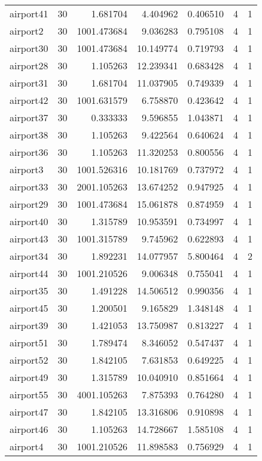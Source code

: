 \documentclass[../../../thesis.tex]{subfiles}
\begin{document}
\begin{longtable}{|l|r|r|r|r|r|r|}
airport41 & 30 & 1.681704 & 4.404962 & 0.406510 & 4 & 1 \\
airport2 & 30 & 1001.473684 & 9.036283 & 0.795108 & 4 & 1 \\
airport30 & 30 & 1001.473684 & 10.149774 & 0.719793 & 4 & 1 \\
airport28 & 30 & 1.105263 & 12.239341 & 0.683428 & 4 & 1 \\
airport31 & 30 & 1.681704 & 11.037905 & 0.749339 & 4 & 1 \\
airport42 & 30 & 1001.631579 & 6.758870 & 0.423642 & 4 & 1 \\
airport37 & 30 & 0.333333 & 9.596855 & 1.043871 & 4 & 1 \\
airport38 & 30 & 1.105263 & 9.422564 & 0.640624 & 4 & 1 \\
airport36 & 30 & 1.105263 & 11.320253 & 0.800556 & 4 & 1 \\
airport3 & 30 & 1001.526316 & 10.181769 & 0.737972 & 4 & 1 \\
airport33 & 30 & 2001.105263 & 13.674252 & 0.947925 & 4 & 1 \\
airport29 & 30 & 1001.473684 & 15.061878 & 0.874959 & 4 & 1 \\
airport40 & 30 & 1.315789 & 10.953591 & 0.734997 & 4 & 1 \\
airport43 & 30 & 1001.315789 & 9.745962 & 0.622893 & 4 & 1 \\
airport34 & 30 & 1.892231 & 14.077957 & 5.800464 & 4 & 2 \\
airport44 & 30 & 1001.210526 & 9.006348 & 0.755041 & 4 & 1 \\
airport35 & 30 & 1.491228 & 14.506512 & 0.990356 & 4 & 1 \\
airport45 & 30 & 1.200501 & 9.165829 & 1.348148 & 4 & 1 \\
airport39 & 30 & 1.421053 & 13.750987 & 0.813227 & 4 & 1 \\
airport51 & 30 & 1.789474 & 8.346052 & 0.547437 & 4 & 1 \\
airport52 & 30 & 1.842105 & 7.631853 & 0.649225 & 4 & 1 \\
airport49 & 30 & 1.315789 & 10.040910 & 0.851664 & 4 & 1 \\
airport55 & 30 & 4001.105263 & 7.875393 & 0.764280 & 4 & 1 \\
airport47 & 30 & 1.842105 & 13.316806 & 0.910898 & 4 & 1 \\
airport46 & 30 & 1.105263 & 14.728667 & 1.585108 & 4 & 1 \\
airport4 & 30 & 1001.210526 & 11.898583 & 0.756929 & 4 & 1 \\

\end{longtable}
\end{document}
